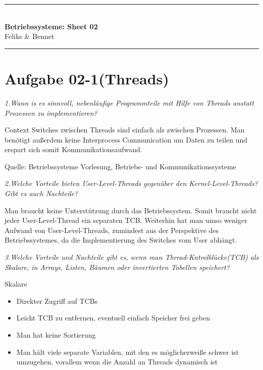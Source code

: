 \documentclass{article}
\newcommand{\sheetNR}{02}
\begin{document}
\hrule\medskip\rule{0ex}{0ex}\\[-1ex]\noindent\large
\textbf{Betriebssysteme: Sheet \sheetNR \space}\\[0.5ex]
\normalsize{Feliks \& Bennet}

\medskip\hrule\noindent\vskip 0.5cm


\section*{Aufgabe \sheetNR-1(Threads)}


\vspace{0.5cm} \noindent \textit{1.Wann is es sinnvoll, nebenläufige
Programmteile mit Hilfe von Threads anstatt Prozessen zu implementieren?}
\vspace{0.5cm}

Context Switches zwischen Threads sind einfach als zwischen Prozessen. Man
benötigt außerdem keine Interprocess Communication um Daten zu teilen und
erspart sich somit Kommunikationsaufwand. 

Quelle: Betriebssysteme Vorlesung, Betriebs- und Kommunikationssysteme

\vspace{0.5cm}\noindent\textit{2.Welche Vorteile bieten User-Level-Threads
gegenüber den Kernel-Level-Threads? Gibt es auch Nachteile?}\vspace{0.5cm}

Man braucht keine Unterstützung durch das Betriebssystem. Somit braucht nicht
jeder User-Level-Thread ein separaten TCB. Weiterhin hat man umso weniger
Aufwand von User-Level-Threads, zumindest aus der Perspektive des
Betriebssystemes, da die Implementierung des Switches vom User abhängt.


\vspace{0.5cm}\noindent\textit{3.Welche Vorteile und Nachteile gibt es, wenn
man Thread-Kntrolblücke(TCB) als Skalare, in Arrays, Listen, Bäumen oder
invertierten Tabellen speichert?}\vspace{0.5cm}

Skalare
\begin{itemize}
\item[+] Direkter Zugriff auf TCBs
\item[+] Leicht TCB zu entfernen, eventuell einfach Speicher frei geben
\item[-] Man hat keine Sortierung
\item[-] Man hält viele separate Variablen, mit den es möglicherweiße schwer
	ist umzugehen, vorallem wenn die Anzahl an Threads dynamisch ist
\end{itemize}
\end{document}
